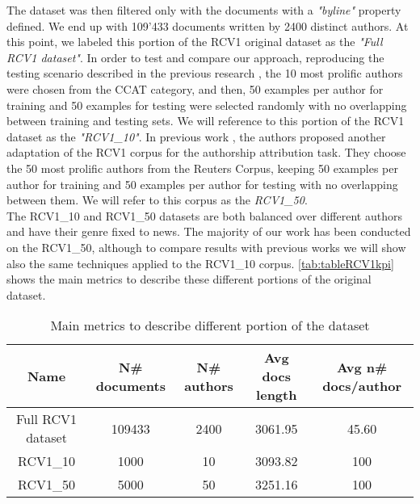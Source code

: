 The dataset was then filtered only with the documents with a \textit{"byline"} property defined. We end up with 109'433 documents written by 2400 distinct authors. At this point, we labeled this portion of the RCV1 original dataset as the \textit{"Full RCV1 dataset"}.
In order to test and compare our approach, reproducing the testing scenario
described in the previous research \cite{stamatatos2009survey}, the 10 most prolific authors were chosen from the CCAT category, and then, 50 examples per author for training and 50 examples for testing were selected randomly with no overlapping between training and testing sets. We will reference to this portion of the RCV1 dataset as the \textit{"RCV1\_10"}.
In previous work \cite{houvardas2006n}, the authors proposed another adaptation of the RCV1 corpus for the authorship attribution task. They choose the 50 most prolific authors from the Reuters Corpus, keeping 50 examples per author for training and 50 examples per author for testing with no
overlapping between them. We will refer to this corpus as the \textit{RCV1\_50}.\\
The RCV1\_10 and RCV1\_50 datasets are both balanced over different authors and have their genre fixed to news.
The majority of our work has been conducted on the RCV1\_50, although to compare results with previous works we will show also the same techniques applied to the RCV1\_10 corpus.
\autoref{tab:tableRCV1kpi} shows the main metrics to describe these different portions of the original dataset.

\begin{table}[h!]
	\begin{center}  
		\caption[RCV1 Corpus]{Main metrics to describe different portion of the dataset} 
		\label{tab:tableRCV1kpi}
		\begin{tabular}{|c | c | c | c | c |}
			\hline 
			Name & N\# documents & N\# authors & Avg docs length & Avg n\# docs/author \\
			\hline
			Full RCV1 dataset & 109433 & 2400 & 3061.95 & 45.60 \\ \hline
			RCV1\_10 & 1000 & 10 & 3093.82 & 100  \\ \hline
			RCV1\_50 & 5000 & 50 & 3251.16 & 100  \\ \hline
		\end{tabular} 
	\end{center}
\end{table}

